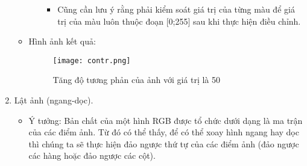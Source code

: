 \documentclass{report}
\begin{document}
\begin{enumerate}
\begin{itemize}
\begin{itemize}
\begin{itemize}
                                \item Cũng cần lưu ý rằng phải kiểm soát giá trị của từng màu để giá trị của màu luôn thuộc đoạn [0;255] sau khi thực hiện điều chỉnh.
                            \end{itemize}
                    \end{itemize}
                \item Hình ảnh kết quả:
                \begin{figure}[!h]
                    \centering
                    \texttt{[image: contr.png]}
                    \caption{Tăng độ tương phản của ảnh với giá trị là 50}
                \end{figure}
            \end{itemize}
        \item Lật ảnh (ngang-dọc).
            \begin{itemize}
                \item Ý tưởng: Bản chất của một hình RGB được tổ chức dưới dạng là ma trận của các điểm ảnh. Từ đó có thể thấy, để có thể xoay hình ngang hay dọc thì chúng ta sẽ thực hiện đảo ngược thứ tự của các điểm ảnh (đảo ngược các hàng hoặc đảo ngược các cột).


\end{itemize}
\end{enumerate}
\end{document}
